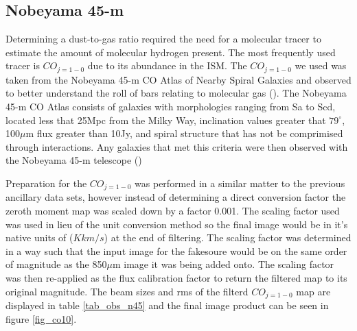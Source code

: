 
\subsection{Nobeyama 45-m}\label{nob_sec}

Determining a dust-to-gas ratio required the need for a molecular tracer to estimate the amount of molecular hydrogen present.  The most frequently used tracer is $CO_{j=1-0}$ due to its abundance in the ISM.  The $CO_{j=1-0}$ we used was taken from the Nobeyama 45-m CO Atlas of Nearby Spiral Galaxies and observed to better understand the roll of bars relating to molecular gas (\citep{kuno2007}).  The Nobeyama 45-m CO Atlas consists of galaxies with morphologies ranging from Sa to Scd, located less that 25Mpc from the Milky Way, inclination values greater that $79^{\circ}$, 100$\mu$m flux greater than 10Jy, and spiral structure that has not be comprimised through interactions.  Any galaxies that met this criteria were then observed with the Nobeyama 45-m telescope (\citep{kuno2007})

Preparation for the $CO_{j=1-0}$ was performed in a similar matter to the previous ancillary data sets, however instead of determining a direct conversion factor the zeroth moment map was scaled down by a factor 0.001.  The scaling factor used was used in lieu of the unit conversion method so the final image would be in it's native units of ($K km/s$) at the end of filtering.  The scaling factor was determined in a way such that the input image for the fakesoure would be on the same order of magnitude as the 850$\mu$m image it was being added onto.  The scaling factor was then re-applied as the flux calibration factor to return the filtered map to its original magnitude.  The beam sizes and rms of the filterd $CO_{j=1-0}$ map are displayed in table \ref{tab_obs_n45} and the final image product can be seen in figure \ref{fig_co10}.

